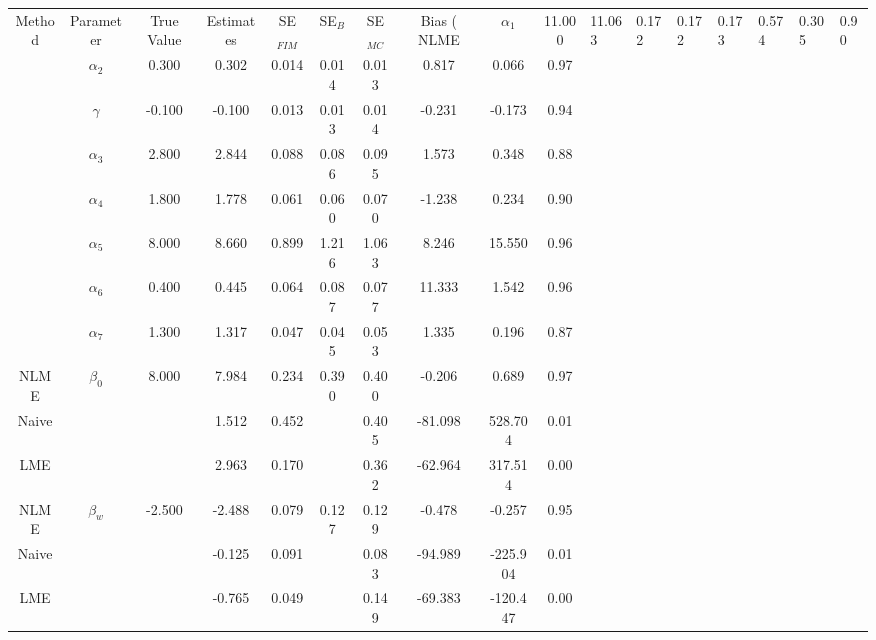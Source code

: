 \begin{table}[ht]
\centering
\begin{tabular}{cccccccccc}
  \hline
Method & Parameter & True Value & Estimates & SE$_{FIM}$ & SE$_{B}$ & SE$_{MC}$ & Bias (%
  \hline
NLME & $\alpha_1$ & 11.000 & 11.063 & 0.172 & 0.172 & 0.173 & 0.574 & 0.305 & 0.90 \\ 
   & $\alpha_2$ & 0.300 & 0.302 & 0.014 & 0.014 & 0.013 & 0.817 & 0.066 & 0.97 \\ 
   & $\gamma$ & -0.100 & -0.100 & 0.013 & 0.013 & 0.014 & -0.231 & -0.173 & 0.94 \\ 
   & $\alpha_3$ & 2.800 & 2.844 & 0.088 & 0.086 & 0.095 & 1.573 & 0.348 & 0.88 \\ 
   & $\alpha_4$ & 1.800 & 1.778 & 0.061 & 0.060 & 0.070 & -1.238 & 0.234 & 0.90 \\ 
   & $\alpha_5$ & 8.000 & 8.660 & 0.899 & 1.216 & 1.063 & 8.246 & 15.550 & 0.96 \\ 
   & $\alpha_6$ & 0.400 & 0.445 & 0.064 & 0.087 & 0.077 & 11.333 & 1.542 & 0.96 \\ 
   \hline
 & $\alpha_7$ & 1.300 & 1.317 & 0.047 & 0.045 & 0.053 & 1.335 & 0.196 & 0.87 \\ 
  NLME & $\beta_0$ & 8.000 & 7.984 & 0.234 & 0.390 & 0.400 & -0.206 & 0.689 & 0.97 \\ 
  Naive &  &  & 1.512 & 0.452 &  & 0.405 & -81.098 & 528.704 & 0.01 \\ 
  LME &  &  & 2.963 & 0.170 &  & 0.362 & -62.964 & 317.514 & 0.00 \\ 
  NLME & $\beta_w$ & -2.500 & -2.488 & 0.079 & 0.127 & 0.129 & -0.478 & -0.257 & 0.95 \\ 
  Naive &  &  & -0.125 & 0.091 &  & 0.083 & -94.989 & -225.904 & 0.01 \\ 
  LME &  &  & -0.765 & 0.049 &  & 0.149 & -69.383 & -120.447 & 0.00 \\ 
   \hline
\end{tabular}
\end{table}
